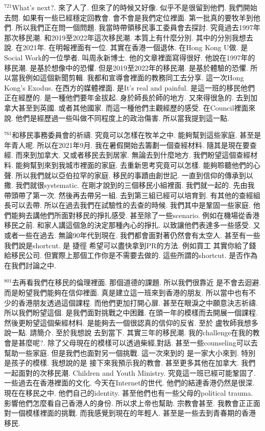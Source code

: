 \documentclass{book}
\begin{document}
$^{721}$What's next?.
來了人了.
但來了的時候又好像.
似乎不是很留到他們.
我們開始去問.
如果有一些已經穩定回教會.
會不會是我們定位裡面.
第一批真的要牧羊到他們.
所以我們正在問一個問題.
我當時帶領移民事工委員會去探討.
究竟過去1997年那次移民潮.
和2019至2022年這次移民潮.
本質上有什麼分別.
其中的分別我想去說.
在2021年.
在明報裡面有一位.
其實在香港一個退休.
在Hong Kong U做.
是Social Work的一位學者.
叫周永新博士.
他的文章裡面寫得很好.
他說在1997年的移民潮.
是基於想像中的恐懼.
但是2019至2022年的移民潮.
是基於體驗的恐懼.
所以當我例如這個新聞剪輯.
我都和宣導會裡面的教務同工去分享.
這一次Hong Kong's Exodus.
在西方的媒體裡面.
是It's real and painful.
是這一班的移民他們正在經歷的.
是一種他們要年金拔起.
身於師長於師的地方.
又來得很急的.
去到加拿大甚至到英國.
或者其他國家.
而這一種他們主觀經歷的感受.
在Council裡面來說.
他們是經歷過一些叫做不同程度上的政治傷害.
所以當我提到這一點.

$^{761}$和移民事務委員會的祈禱.
究竟可以怎樣在牧羊之中.
能夠幫到這些家庭.
甚至是年青人呢.
所以在2021年9月.
我在暑假開始去籌劃一個查經材料.
隨其是現在要查經.
而來到加拿大.
又或者移民去到居家.
無論去到什麼地方.
我們盼望這個查經材料.
能夠幫到來到我城市裡面的家庭.
去重新思考究竟可以怎樣.
能夠聆聽他們的心聲.
所以我們就以亞伯拉罕的家庭.
移民的事蹟由創世記.
一直到信仰的傳承到以撒.
我們就很systematic.
在剛才說到的三個移民小組裡面.
我們就一起的.
先由我帶頭帶了第一次.
然後再去帶另一組.
去到第三組已經可以培育到.
有其他的查經組長可以去帶.
所以在過去我們在試驗性的去查的時候.
我們其中是鞏固一些家庭.
他們能夠去講他們所面對移民的掙扎感受.
甚至除了一些scenario.
例如在機場從香港移民之前.
和家人講這個急的決定那種內心的掙扎.
以致讓他們表達多一些感受.
又或者一些在過去.
無論90年代到現在.
我們都會面對著仍然會有太空人.
甚至有一些我們說是shortcut.
是 捷徑 希望可以盡快拿到PR的方法.
例如買工 其實你給了錢給移民公司.
但實際上那個工作你是不需要去做的.
這些所謂的shortcut.
是否作為在我們討論之中.

$^{801}$去再看我們在移民的倫理裡面.
那個道德的課題.
所以我們很靠近 是不會去迴避.
而是盼望我們能夠在信仰裡面.
真是建立這一班來到香港的朋友.
所以當中也有不少的香港朋友透過這個課程.
而他們更加打開心扉.
甚至在眼淚之中願意決志祈禱.
所以我們盼望這個.
是我們面對挑戰之中困難.
在頭一年的模樣而去開展一個課程.
然後更盼望這個柴經材料.
是能夠去一個很認真的信仰的反省.
至於 盧牧師我想多說一點.
請簡介.
至於我想說 去到當下.
其實三年的移民潮.
我的challenge在我的教會是甚麼呢?.
除了父母現在的模樣可以透過柴經,對話.
甚至一些counseling可以去幫助一些家庭.
但是我們也面對另一個挑戰.
這一次來到的 是一家大小來到.
特別是孩子的模樣.
我想說的是 接下來我預示我的教會.
甚至更多其他在加拿大.
我們一起面對的次移民潮.
Children and Youth Ministry.
究竟這一班已經可能鞏固了.
一些過去在香港裡面的文化.
今天在Internet的世代.
他們的結連香港仍然是很深.
現在在移民之中.
他們自己的identity.
甚至他們也有一些父母的political trauma.
影響他們怎麼看自己香港人的身份.
所以求上帝也幫助.
宗教會甚至.
我教會正正面對一個模樣裡面的挑戰.
而我感覺到現在的年輕人.
甚至是一些去到青春期的香港移民.
\end{document}
